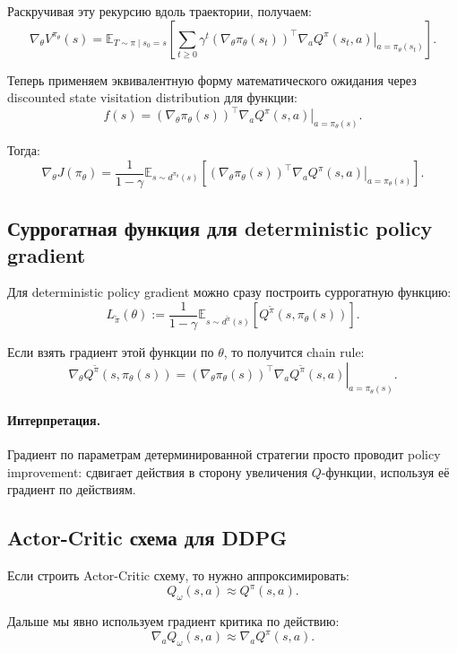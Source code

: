 \documentclass[12pt,a4paper]{article}
\begin{document}
Раскручивая эту рекурсию вдоль траектории, получаем:
\[
\nabla_\theta V^{\pi_\theta}(s)
=
\mathbb E_{T\sim \pi\mid s_0=s}
\left[
\sum_{t\ge 0}
\gamma^t
\left(
\nabla_\theta \pi_\theta(s_t)
\right)^\top
\left.
\nabla_a Q^\pi(s_t,a)
\right|_{a=\pi_\theta(s_t)}
\right].
\]

Теперь применяем эквивалентную форму математического ожидания через discounted state visitation distribution для функции:
\[
f(s)
=
\left(
\nabla_\theta \pi_\theta(s)
\right)^\top
\left.
\nabla_a Q^\pi(s,a)
\right|_{a=\pi_\theta(s)}.
\]

Тогда:
\[
\nabla_\theta J(\pi_\theta)
=
\frac{1}{1-\gamma}
\mathbb E_{s\sim d^{\pi_\theta}(s)}
\left[
\left(
\nabla_\theta \pi_\theta(s)
\right)^\top
\left.
\nabla_a Q^\pi(s,a)
\right|_{a=\pi_\theta(s)}
\right].
\]

\subsection{Суррогатная функция для deterministic policy gradient}

Для deterministic policy gradient можно сразу построить суррогатную функцию:
\[
L_{\tilde\pi}(\theta)
:=
\frac{1}{1-\gamma}
\mathbb E_{s\sim d^{\tilde\pi}(s)}
\left[
Q^{\tilde\pi}(s,\pi_\theta(s))
\right].
\]

Если взять градиент этой функции по $\theta$, то получится chain rule:
\[
\nabla_\theta Q^{\tilde\pi}(s,\pi_\theta(s))
=
\left(
\nabla_\theta \pi_\theta(s)
\right)^\top
\left.
\nabla_a Q^{\tilde\pi}(s,a)
\right|_{a=\pi_\theta(s)}.
\]

\paragraph{Интерпретация.}

Градиент по параметрам детерминированной стратегии просто проводит policy improvement: сдвигает действия в сторону увеличения $Q$-функции, используя её градиент по действиям.

\subsection{Actor-Critic схема для DDPG}

Если строить Actor-Critic схему, то нужно аппроксимировать:
\[
Q_\omega(s,a)
\approx
Q^\pi(s,a).
\]

Дальше мы явно используем градиент критика по действию:
\[
\nabla_a Q_\omega(s,a)
\approx
\nabla_a Q^\pi(s,a).
\]
\end{document}
